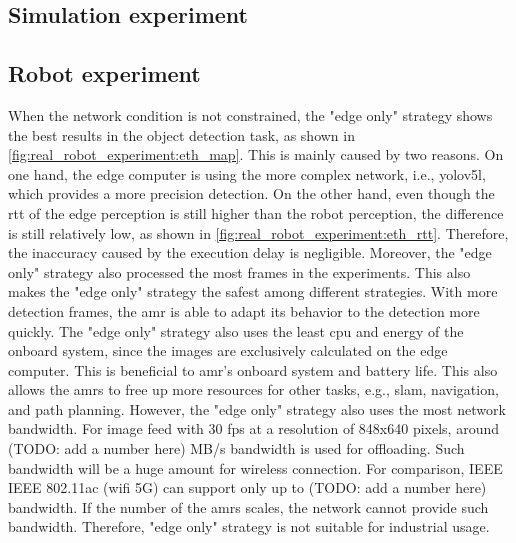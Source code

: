 \subsection{Simulation experiment}

\subsection{Robot experiment}

When the network condition is not constrained, the "edge only" strategy shows the best results in the object detection task, as shown in \cref{fig:real_robot_experiment:eth_map}. This is mainly caused by two reasons. On one hand, the edge computer is using the more complex network, i.e., \gls{yolov5}l, which provides a more precision detection. On the other hand, even though the \gls{rtt} of the edge perception is still higher than the robot perception, the difference is still relatively low, as shown in \cref{fig:real_robot_experiment:eth_rtt}. Therefore, the inaccuracy caused by the execution delay is negligible. Moreover, the "edge only" strategy also processed the most frames in the experiments. This also makes the "edge only" strategy the safest among different strategies. With more detection frames, the \gls{amr} is able to adapt its behavior to the detection more quickly. The "edge only" strategy also uses the least \gls{cpu} and energy of the onboard system, since the images are exclusively calculated on the edge computer. This is beneficial to \gls{amr}'s onboard system and battery life. This also allows the \glspl{amr} to free up more resources for other tasks, e.g., \gls{slam}, navigation, and path planning. However, the "edge only" strategy also uses the most network bandwidth. For image feed with 30 \gls{fps} at a resolution of 848x640 pixels, around (TODO: add a number here) MB/s bandwidth is used for offloading. Such bandwidth will be a huge amount for wireless connection. For comparison, IEEE IEEE 802.11ac (\gls{wifi} 5G) can support only up to (TODO: add a number here) bandwidth. If the number of the \glspl{amr} scales, the network cannot provide such bandwidth. Therefore, "edge only" strategy is not suitable for industrial usage. 

